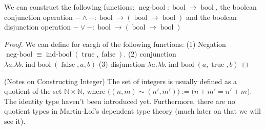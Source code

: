 \begin{proposition}
    We can construct the following functions: $\operatorname{neg-bool}:\operatorname{bool}\to\operatorname{bool}$, the boolean conjunction operation $-\wedge-:\operatorname{bool}\to(\operatorname{bool}\to\operatorname{bool})$ and the boolean disjunction operation $-\vee-:\operatorname{bool}\to(\operatorname{bool}\to\operatorname{bool})$
\end{proposition}
\begin{proof}
    We can define for eacgh of the following functions: (1) Negation $\operatorname{neg-bool}\equiv\operatorname{ind-bool}(\operatorname{true}, \operatorname{false})$. (2) conjunction $\lambda a.\lambda b.\operatorname{ind-bool}(\operatorname{false}, a, b)$ (3) disjunction $\lambda a.\lambda b.\operatorname{ind-bool}(a,\operatorname{true},b)$
\end{proof}

\begin{remark}{(Notes on Constructing Integer)}
    The set of integers is usually defined as a quotient of the set $\mathbb{N}\times\mathbb{N}$, where $\big( (n,m)\sim(n',m') \big) := \big(n+m'=n'+m\big)$. The identity type haven't been introduced yet. Furthermore, there are no quotient types in Martin-Lof's dependent type theory (much later on that we will see it). 
\end{remark}

